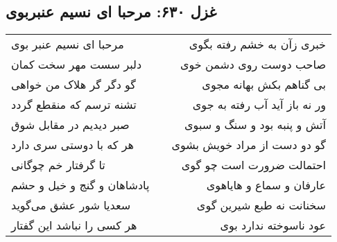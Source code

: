 \begin{center}
\section*{غزل ۶۳۰: مرحبا ای نسیم عنبربوی}
\label{sec:630}
\begin{longtable}{l p{0.5cm} r}
مرحبا ای نسیم عنبر بوی
&&
خبری زآن به خشم رفته بگوی
\\
دلبر سست مهر سخت کمان
&&
صاحب دوست روی دشمن خوی
\\
گو دگر گر هلاک من خواهی
&&
بی گناهم بکش بهانه مجوی
\\
تشنه ترسم که منقطع گردد
&&
ور نه باز آید آب رفته به جوی
\\
صبر دیدیم در مقابل شوق
&&
آتش و پنبه بود و سنگ و سبوی
\\
هر که با دوستی سری دارد
&&
گو دو دست از مراد خویش بشوی
\\
تا گرفتار خم چوگانی
&&
احتمالت ضرورت است چو گوی
\\
پادشاهان و گنج و خیل و حشم
&&
عارفان و سماع و هایاهوی
\\
سعدیا شور عشق می‌گوید
&&
سخنانت نه طبع شیرین گوی
\\
هر کسی را نباشد این گفتار
&&
عود ناسوخته ندارد بوی
\\
\end{longtable}
\end{center}
